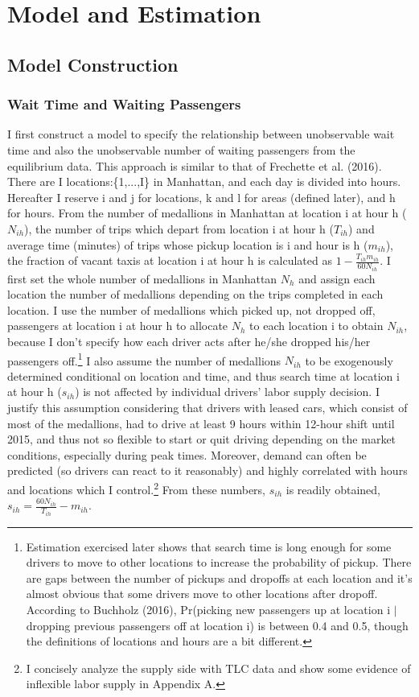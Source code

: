 \vspace{1.0cm}
\section{Model and Estimation}
\subsection{Model Construction}
\subsubsection{Wait Time and Waiting Passengers}

\hspace{0.5cm} I first construct a model to specify the relationship between unobservable wait time and also the unobservable number of waiting passengers from the equilibrium data. This approach is similar to that of Frechette et al. (2016). There are I locations:\{1,...,I\} in Manhattan, and each day is divided into hours. Hereafter I reserve i and j for locations, k and l for areas (defined later), and h for hours. From the number of medallions in Manhattan at location i at hour h ($N_{ih}$), the number of trips which depart from location i at hour h ($T_{ih}$) and average time (minutes) of trips whose pickup location is i and hour is h ($m_{ih}$), the fraction of vacant taxis at location i at hour h is calculated as $1-\frac{T_{ih}m_{ih}}{60N_{ih}}$. I first set the whole number of medallions in Manhattan $N_h$ and assign each location the number of medallions depending on the trips completed in each location. I use the number of medallions which picked up, not dropped off, passengers at location i at hour h to allocate $N_h$ to each location i to obtain $N_{ih}$, because I don't specify how each driver acts after he/she dropped his/her passengers off.\footnote{Estimation exercised later shows that search time is long enough for some drivers to move to other locations to increase the probability of pickup. There are gaps between the number of pickups and dropoffs at each location and it's almost obvious that some drivers move to other locations after dropoff. According to Buchholz (2016), Pr(picking new passengers up at location i $|$ dropping previous passengers off at location i) is between 0.4 and 0.5, though the definitions of locations and hours are a bit different.} I also assume the number of medallions $N_{ih}$ to be exogenously determined conditional on location and time, and thus search time at location i at hour h ($s_{ih}$) is not affected by individual drivers' labor supply decision. I justify this assumption considering that drivers with leased cars, which consist of most of the medallions, had to drive at least 9 hours within 12-hour shift until 2015, and thus not so flexible to start or quit driving depending on the market conditions, especially during peak times. Moreover, demand can often be predicted (so drivers can react to it reasonably) and highly correlated with hours and locations which I control.\footnote{I concisely analyze the supply side with TLC data and show some evidence of inflexible labor supply in Appendix A.} From these numbers, $s_{ih}$ is readily obtained, $s_{ih} = \frac{60N_{ih}}{T_{ih}}-m_{ih}$. 

